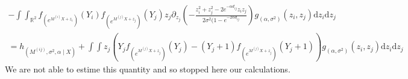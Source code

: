 \documentclass[11pt, a4paper]{article}
\begin{document}
 \begin{align*}
 - \int \int_{\mathbb{R}^2} f_{(e^{M^{(i)} X + z_i})}(Y_i) f_{(e^{M^{(j)} X + z_j})}(Y_j) z_j \partial_{z_j} (- \frac{z_i^2+z_j^2-2 e^{- \alpha d_{ij}} z_i z_j}{2 \sigma^2 (1- e^{-2 \alpha d_{ij}}}) g_{(\alpha,\sigma^2)} (z_i,z_j) \mathrm{d}z_i \mathrm{d} z_j\\
 = h_{(M^{(ij)},\sigma^2,\alpha \mid X)}
  +  \int \int z_j(Y_j f_{(e^{M^{(j)} X + z_j})}(Y_j) - (Y_j+1) f_{(e^{M^{(j)} X + z_j})}(Y_j+1))g_{(\alpha,\sigma^2)} (z_i,z_j) \mathrm{d}z_i \mathrm{d} z_j
 \end{align*}
We are not able to estime this quantity and so stopped here our calculations.
\newpage


\end{document}
